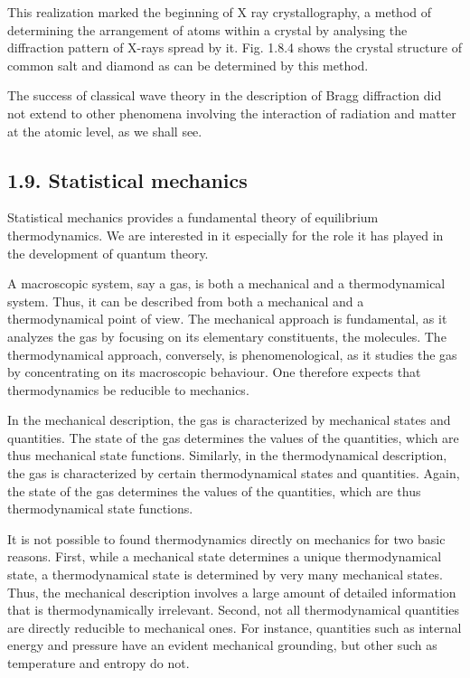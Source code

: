 \documentclass{article}
\begin{document}
This realization marked the beginning of X ray crystallography, a method of determining the arrangement of atoms within a crystal by analysing the diffraction pattern of X-rays spread by it. Fig. 1.8.4 shows the crystal structure of common salt and diamond as can be determined by this method.

The success of classical wave theory in the description of Bragg diffraction did not extend to other phenomena involving the interaction of radiation and matter at the atomic level, as we shall see.

\subsection*{1.9. Statistical mechanics}

Statistical mechanics provides a fundamental theory of equilibrium thermodynamics. We are interested in it especially for the role it has played in the development of quantum theory.

A macroscopic system, say a gas, is both a mechanical and a thermodynamical system. Thus, it can be described from both a mechanical and a thermodynamical point of view. The mechanical approach is fundamental, as it analyzes the gas by focusing on its elementary constituents, the molecules. The thermodynamical approach, conversely, is phenomenological, as it studies the gas by concentrating on its macroscopic behaviour. One therefore expects that thermodynamics be reducible to mechanics.

In the mechanical description, the gas is characterized by mechanical states and quantities. The state of the gas determines the values of the quantities, which are thus mechanical state functions. Similarly, in the thermodynamical description, the gas is characterized by certain thermodynamical states and quantities. Again, the state of the gas determines the values of the quantities, which are thus thermodynamical state functions.

It is not possible to found thermodynamics directly on mechanics for two basic reasons. First, while a mechanical state determines a unique thermodynamical state, a thermodynamical state is determined by very many mechanical states. Thus, the mechanical description involves a large amount of detailed information that is thermodynamically irrelevant. Second, not all thermodynamical quantities are directly reducible to mechanical ones. For instance, quantities such as internal energy and pressure have an evident mechanical grounding, but other such as temperature and entropy do not.
\end{document}
